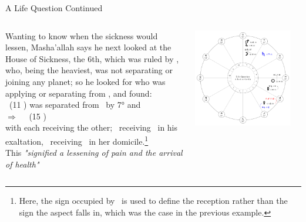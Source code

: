 \begin{frame}[t]{A Life Question Continued}
\begin{columns}[T, onlytextwidth]
Wanting to know when the sickness would lessen, Masha'allah says he next looked at the House of Sickness, the 6th, which was ruled by \Saturn, who, being the heaviest, was not separating or joining any planet; so he looked for who was applying or separating from \Saturn, and found: \\

\vspace{0.25cm}
\Venus\ (11 \Capricorn) was separated from \Saturn\ by 7° and \\
\hspace{1em}$\Rightarrow$ \Trine\ \Mars\ (15 \Taurus) \\ 
with each receiving the other; \Mars\ receiving \Venus\ in his exaltation, \Venus\ receiving \Mars\ in her domicile.\footnote{Here, the sign occupied by \Mars\ is used to define the reception rather than the sign the aspect falls in, which was the case in the previous example.}\\

\vspace{0.25cm}
This \textsl{"signified a lessening of pain and the arrival of health"}
\begin{center}
{\includegraphics[width=0.9\textwidth]{charts/22a-chart-life}}
\end{center}
\end{columns}
\end{frame}